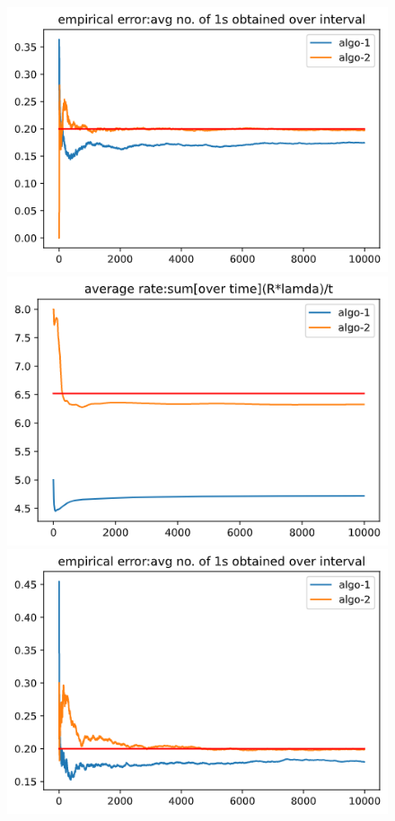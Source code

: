 \documentclass[BTech,thesis]{iitmdiss}
\begin{document}
\begin{figure}[H]
   \begin{center}
     \includegraphics[scale=0.4]{68-comb-err.png}
     \includegraphics[scale=0.4]{68-comb-rate.png}
     \includegraphics[scale=0.4]{1012-comb-err.png}

\end{center}
\end{figure}
\end{document}
